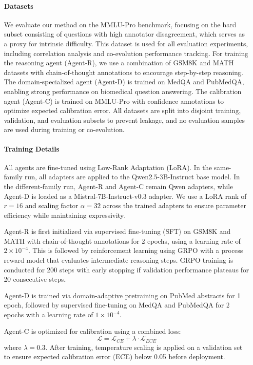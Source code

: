 \documentclass{article}
\begin{document}
\paragraph{Datasets}
We evaluate our method on the MMLU-Pro benchmark, focusing on the hard subset consisting of questions with high annotator disagreement, which serves as a proxy for intrinsic difficulty. This dataset is used for all evaluation experiments, including correlation analysis and co-evolution performance tracking. For training the reasoning agent (Agent-R), we use a combination of GSM8K and MATH datasets with chain-of-thought annotations to encourage step-by-step reasoning. The domain-specialized agent (Agent-D) is trained on MedQA and PubMedQA, enabling strong performance on biomedical question answering. The calibration agent (Agent-C) is trained on MMLU-Pro with confidence annotations to optimize expected calibration error. All datasets are split into disjoint training, validation, and evaluation subsets to prevent leakage, and no evaluation samples are used during training or co-evolution.
\paragraph{Training Details}
All agents are fine-tuned using Low-Rank Adaptation (LoRA). In the same-family run, all adapters are applied to the Qwen2.5-3B-Instruct base model. In the different-family run, Agent-R and Agent-C remain Qwen adapters, while Agent-D is loaded as a Mistral-7B-Instruct-v0.3 adapter. We use a LoRA rank of $r=16$ and scaling factor $\alpha=32$ across the trained adapters to ensure parameter efficiency while maintaining expressivity.

Agent-R is first initialized via supervised fine-tuning (SFT) on GSM8K and MATH with chain-of-thought annotations for 2 epochs, using a learning rate of $2 \times 10^{-4}$. This is followed by reinforcement learning using GRPO with a process reward model that evaluates intermediate reasoning steps. GRPO training is conducted for 200 steps with early stopping if validation performance plateaus for 20 consecutive steps.

Agent-D is trained via domain-adaptive pretraining on PubMed abstracts for 1 epoch, followed by supervised fine-tuning on MedQA and PubMedQA for 2 epochs with a learning rate of $1 \times 10^{-4}$.

Agent-C is optimized for calibration using a combined loss:
\begin{equation}
\mathcal{L} = \mathcal{L}_{CE} + \lambda \cdot \mathcal{L}_{ECE}
\end{equation}
where $\lambda = 0.3$. After training, temperature scaling is applied on a validation set to ensure expected calibration error (ECE) below 0.05 before deployment.
\end{document}
